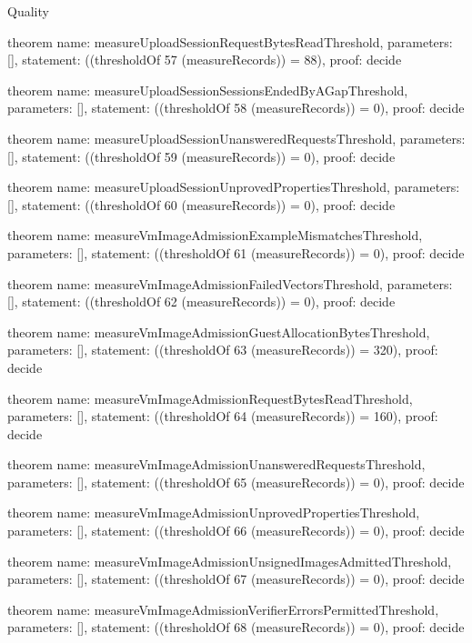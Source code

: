 \begin{lexlean}{Quality}
\begin{semanticmodule}
theorem{
  name: measureUploadSessionRequestBytesReadThreshold,
  parameters: [],
  statement: ((thresholdOf 57 (measureRecords)) = 88),
  proof: decide{}
}

theorem{
  name: measureUploadSessionSessionsEndedByAGapThreshold,
  parameters: [],
  statement: ((thresholdOf 58 (measureRecords)) = 0),
  proof: decide{}
}

theorem{
  name: measureUploadSessionUnansweredRequestsThreshold,
  parameters: [],
  statement: ((thresholdOf 59 (measureRecords)) = 0),
  proof: decide{}
}

theorem{
  name: measureUploadSessionUnprovedPropertiesThreshold,
  parameters: [],
  statement: ((thresholdOf 60 (measureRecords)) = 0),
  proof: decide{}
}

theorem{
  name: measureVmImageAdmissionExampleMismatchesThreshold,
  parameters: [],
  statement: ((thresholdOf 61 (measureRecords)) = 0),
  proof: decide{}
}

theorem{
  name: measureVmImageAdmissionFailedVectorsThreshold,
  parameters: [],
  statement: ((thresholdOf 62 (measureRecords)) = 0),
  proof: decide{}
}

theorem{
  name: measureVmImageAdmissionGuestAllocationBytesThreshold,
  parameters: [],
  statement: ((thresholdOf 63 (measureRecords)) = 320),
  proof: decide{}
}

theorem{
  name: measureVmImageAdmissionRequestBytesReadThreshold,
  parameters: [],
  statement: ((thresholdOf 64 (measureRecords)) = 160),
  proof: decide{}
}

theorem{
  name: measureVmImageAdmissionUnansweredRequestsThreshold,
  parameters: [],
  statement: ((thresholdOf 65 (measureRecords)) = 0),
  proof: decide{}
}

theorem{
  name: measureVmImageAdmissionUnprovedPropertiesThreshold,
  parameters: [],
  statement: ((thresholdOf 66 (measureRecords)) = 0),
  proof: decide{}
}

theorem{
  name: measureVmImageAdmissionUnsignedImagesAdmittedThreshold,
  parameters: [],
  statement: ((thresholdOf 67 (measureRecords)) = 0),
  proof: decide{}
}

theorem{
  name: measureVmImageAdmissionVerifierErrorsPermittedThreshold,
  parameters: [],
  statement: ((thresholdOf 68 (measureRecords)) = 0),
  proof: decide{}
}
\end{semanticmodule}
\end{lexlean}
